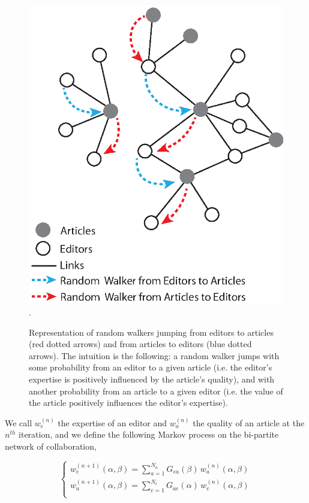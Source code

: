 \begin{figure}[!t]
\centering
\includegraphics[width=0.7\columnwidth]{../Figures/bi-partite_net.eps}.
\caption{Representation of random walkers jumping from editors to articles (red dotted arrows) and from articles to editors (blue dotted arrows). The intuition is the following: a random walker jumps with some probability from an editor to a given article (i.e. the editor's expertise is positively influenced by the article's quality), and with another probability from an article to a given editor (i.e. the value of the article positively influences the editor's expertise).}
\label{fig:jumpers}
\end{figure}

We call $w^{(n)}_e$ the expertise of an editor and $w^{(n)}_a$ the quality of an article at the $n^{th}$ iteration, and we define the following Markov process on the bi-partite network of collaboration, 

\begin{equation}
\begin{cases}
w^{(n+1)}_e (\alpha,\beta) = \sum_{a=1}^{N_a}  G_{ea}(\beta) \,w^{(n)}_a (\alpha,\beta)\\[7pt]
w^{(n+1)}_a (\alpha,\beta) = \sum_{e=1}^{N_e}  G_{ae}(\alpha) \, w^{(n)}_e (\alpha,\beta)\\
\end{cases}
\label{random_walker}
\end{equation}

